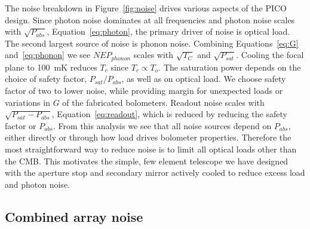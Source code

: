 \documentclass[]{spie}  %
\newcommand{\comr}[1]{\textcolor{red}{#1}}
\begin{document}



The noise breakdown in Figure~\ref{fig:noise} drives various aspects of the PICO design. Since photon noise dominates at all frequencies and 
photon noise scales with $\sqrt{P_{abs}}$, Equation~\ref{eq:photon}, the primary driver of noise is optical load.   The second largest source 
of noise is phonon noise.  Combining
Equations~\ref{eq:G} and~\ref{eq:phonon} we see $NEP_{phonon}$ scales with $\sqrt{T_C}$ and $\sqrt{P_{sat}}$.  Cooling the focal plane to 100~mK 
reduces $T_c$ since $T_c \propto T_o$.  The saturation power depends on the choice of safety factor, $P_{sat}/P_{abs}$, as well as on optical load.  
We choose safety factor of two to lower noise, while providing margin for unexpected loads or variations in $G$ of the fabricated 
bolometers. Readout noise scales with $\sqrt{P_{sat} - P_{abs}}$, Equation~\ref{eq:readout}, which is reduced by reducing the safety factor or $P_{abs}$.  
From this analysis we see that all noise sources depend on $P_{abs}$, either directly or through how load drives bolometer properties.  Therefore the 
most straightforward way to reduce noise is to limit all optical loads other than the CMB.  This motivates the simple, few element telescope we 
have designed with the aperture stop and secondary mirror actively cooled to reduce excess load and photon noise. 

\subsection{Combined array noise}
\end{document}
